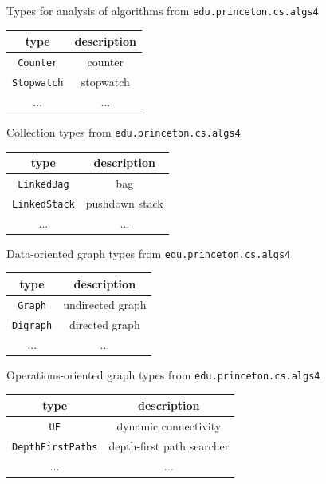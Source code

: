 \documentclass[8pt,a4paper,compress]{beamer}
\begin{document}
\begin{frame}[fragile]
\pause

Types for analysis of algorithms from \lstinline{edu.princeton.cs.algs4}
\begin{center}
\begin{tabular}{cc}
type & description \\ \hline
\lstinline$Counter$ &  counter \\
\lstinline$Stopwatch$ & stopwatch \\
$\dots$ & $\dots$
\end{tabular} 
\end{center}

\pause

Collection types from \lstinline{edu.princeton.cs.algs4}
\begin{center}
\begin{tabular}{cc}
type & description \\ \hline
\lstinline$LinkedBag$ & bag \\
\lstinline$LinkedStack$ & pushdown stack \\
$\dots$ & $\dots$
\end{tabular} 
\end{center}

\pause

Data-oriented graph types from \lstinline{edu.princeton.cs.algs4}
\begin{center}
\begin{tabular}{cc}
type & description \\ \hline
\lstinline$Graph$  & undirected graph \\
\lstinline$Digraph$ & directed graph \\
$\dots$ & $\dots$
\end{tabular} 
\end{center}

\pause

Operations-oriented graph types from \lstinline{edu.princeton.cs.algs4}
\begin{center}
\begin{tabular}{cc}
type & description \\ \hline
\lstinline$UF$ & dynamic connectivity \\
\lstinline$DepthFirstPaths$ & depth-first path searcher \\
$\dots$ & $\dots$
\end{tabular} 
\end{center}
\end{frame}
\end{document}
